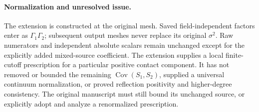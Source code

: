 \documentclass[11pt]{article}
\newcommand{\Cov}{\operatorname{Cov}}
\begin{document}
\paragraph{Normalization and unresolved issue.}
The extension is constructed at the original mesh. Saved field-independent factors enter
as $\Gamma_1\Gamma_2$; subsequent output meshes never replace its original $\sigma^2$.
Raw numerators and independent absolute scalars remain unchanged except for the explicitly
added mixed-source coefficient. The extension supplies a local finite-cutoff prescription
for a particular positive contact component. It has not removed or bounded the remaining
$\Cov(S_1,S_2)$, supplied a universal continuum normalization, or proved reflection
positivity and higher-degree consistency. The original manuscript must still bound its
unchanged source, or explicitly adopt and analyze a renormalized prescription.
\end{document}
